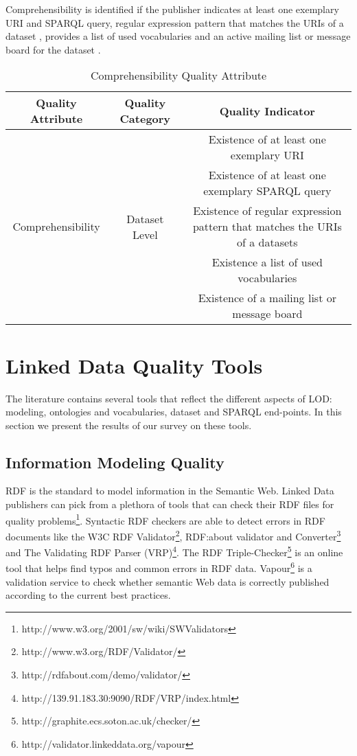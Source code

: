 \documentclass[onecolumn, crcready]{iosart2c}
\begin{document}
Comprehensibility is identified if the publisher indicates at least one exemplary URI and SPARQL query, regular expression pattern that matches the URIs of a dataset \cite{Framework2012}, provides a list of used vocabularies and an active mailing list or message board for the dataset \cite{flemming2010}. 
\begin{table}[h]
\begin{tabular}{|c|c|c|}
\hline 
Quality Attribute & Quality Category & Quality Indicator\tabularnewline
\hline 
\multirow{5}{*}{Comprehensibility} & \multirow{5}{*}{Dataset Level} & Existence of at least one exemplary URI\tabularnewline
\cline{3-3} 
 &  & Existence of at least one exemplary SPARQL query\tabularnewline
\cline{3-3} 
 &  & Existence of regular expression pattern that matches the URIs of a datasets\tabularnewline
\cline{3-3} 
 &  & Existence a list of used vocabularies \tabularnewline
\cline{3-3} 
 &  & Existence of a mailing list or message board\tabularnewline
\hline 
\end{tabular}\caption{Comprehensibility Quality Attribute}
\end{table}

\section{Linked Data Quality Tools}
The literature contains several tools that reflect the different aspects of LOD: modeling, ontologies and vocabularies, dataset and SPARQL end-points. In this section we present the results of our survey on these tools.

\subsection{Information Modeling Quality}
RDF is the standard to model information in the Semantic Web. Linked Data publishers can pick from a plethora of tools that can check their RDF files for quality problems\footnote{http://www.w3.org/2001/sw/wiki/SWValidators}. Syntactic RDF checkers are able to detect errors in RDF documents like the W3C RDF Validator\footnote{http://www.w3.org/RDF/Validator/}, RDF:about validator and Converter\footnote{http://rdfabout.com/demo/validator/} and The Validating RDF Parser (VRP)\footnote{http://139.91.183.30:9090/RDF/VRP/index.html}. The RDF Triple-Checker\footnote{http://graphite.ecs.soton.ac.uk/checker/} is an online tool that helps find typos and common errors in RDF data. Vapour\footnote{http://validator.linkeddata.org/vapour} \cite{Berrueta08cookinghttp} is a validation service to check whether semantic Web data is correctly published according to the current best practices\cite{tim:linkedata}.
\end{document}
